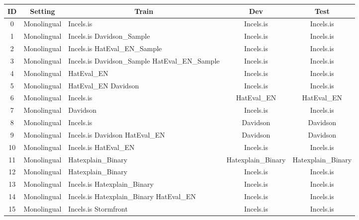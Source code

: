 \begin{tabular}{|c|c|p{3cm}|c|c|}
\hline
\textbf{ID} & \textbf{Setting} & \multicolumn{1}{c|}{\textbf{Train}} & \textbf{Dev} & \textbf{Test} \\ \hline
0 & Monolingual & Incels.is & Incels.is & Incels.is \\ \hline
1 & Monolingual & Incels.is \newline Davidson\_Sample & Incels.is & Incels.is \\ \hline
2 & Monolingual & Incels.is \newline HatEval\_EN\_Sample & Incels.is & Incels.is \\ \hline
3 & Monolingual & Incels.is \newline Davidson\_Sample \newline HatEval\_EN\_Sample & Incels.is & Incels.is \\ \hline
4 & Monolingual & HatEval\_EN & Incels.is & Incels.is \\ \hline
5 & Monolingual & HatEval\_EN \newline Davidson & Incels.is & Incels.is \\ \hline
6 & Monolingual & Incels.is & HatEval\_EN & HatEval\_EN \\ \hline
7 & Monolingual & Davidson & Incels.is & Incels.is \\ \hline
8 & Monolingual & Incels.is & Davidson & Davidson \\ \hline
9 & Monolingual & Incels.is \newline Davidson \newline HatEval\_EN & Davidson & Davidson \\ \hline
10 & Monolingual & Incels.is \newline HatEval\_EN & Incels.is & Incels.is \\ \hline
11 & Monolingual & Hatexplain\_Binary & Hatexplain\_Binary & Hatexplain\_Binary \\ \hline
12 & Monolingual & Hatexplain\_Binary & Incels.is & Incels.is \\ \hline
13 & Monolingual & Incels.is \newline Hatexplain\_Binary & Incels.is & Incels.is \\ \hline
14 & Monolingual & Incels.is \newline Hatexplain\_Binary \newline HatEval\_EN & Incels.is & Incels.is \\ \hline
15 & Monolingual & Incels.is \newline Stormfront & Incels.is & Incels.is \\ \hline

\end{tabular}
